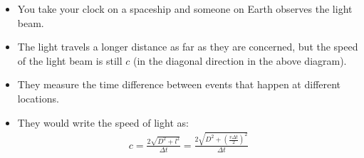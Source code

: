 \documentclass[aspectratio=169,
hyperref={colorlinks,urlcolor=blue}
]{beamer}
\begin{document}
{
\begin{itemize}
\item You take your clock on a spaceship and someone on Earth observes the light beam.
\item The light travels a longer distance as far as they are concerned, but the speed of the light beam is still $c$ (in the diagonal direction in the above diagram).
\item They measure the time difference between events that happen at different locations.
\item They would write the speed of light as:
\begin{align*}
c= \frac{2\sqrt{D^2+l^2}}{\Delta t}=\frac{2\sqrt{D^2+\left(\frac{v\Delta t}{2} \right)^2}}{\Delta t}
\end{align*}
\end{itemize}
}
\end{document}
